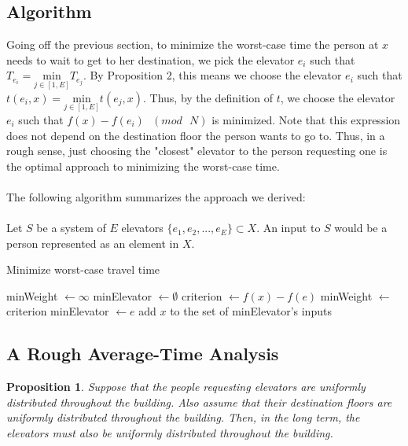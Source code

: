 \documentclass[letterpaper]{article} %
\newtheorem{prop}{Proposition}
\begin{document}
\subsection{Algorithm}
Going off the previous section, to minimize the worst-case time the person at $x$ needs to wait to get to her destination, we pick the elevator $e_i$ such that $T_{e_i} = \underset{j \in [1, E]}{\mathrm{min}} T_{e_j}$. By Proposition 2, this means we choose the elevator $e_i$ such that $t(e_i, x) = \underset{j \in [1, E]}{\mathrm{min}} t(e_j, x)$. Thus, by the definition of $t$, we choose the elevator $e_i$ such that $f(x) - f(e_i) \text{ } (mod \text{ } N)$ is minimized. Note that this expression does not depend on the destination floor the person wants to go to. Thus, in a rough sense, just choosing the "closest" elevator to the person requesting one is the optimal approach to minimizing the worst-case time. \\\\
The following algorithm summarizes the approach we derived:\\\\
Let $S$ be a system of $E$ elevators $\{e_1, e_2, ... , e_E\} \subset X$. An input to $S$ would be a person represented as an element in $X$.\\
\begin{algorithm}
\caption{Minimize worst-case travel time}\label{euclid}
\begin{algorithmic}[1]
	\State minWeight $\leftarrow \infty$
	\State minElevator $\leftarrow \emptyset$
		\State criterion $\leftarrow f(x) - f(e)$
			\State minWeight $\leftarrow$ criterion
			\State minElevator $\leftarrow e$
		\EndIf
	\EndFor
	\State add $x$ to the set of minElevator's inputs
\EndFor
\EndProcedure
\end{algorithmic}
\end{algorithm}

\subsection{A Rough Average-Time Analysis}
\begin{prop}
	Suppose that the people requesting elevators are uniformly distributed throughout the building. Also assume that their destination floors are uniformly distributed throughout the building. Then, in the long term, the elevators must also be uniformly distributed throughout the building. 
\end{prop}
\end{document}
